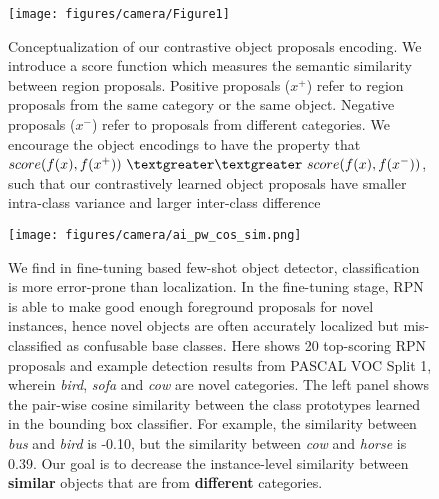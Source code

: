 \documentclass[final]{cvpr}
\begin{document}
\begin{figure}[h]
\begin{center}
\texttt{[image: figures/camera/Figure1]}
\caption{Conceptualization of our contrastive object proposals encoding. We introduce a score function which measures the semantic similarity between region proposals. Positive proposals ($x^+$) refer to region proposals from the same category or the same object. Negative proposals ($x^-$) refer to proposals from different categories. We encourage the object encodings to have the property that $score(f(x),f(x^+))~\textgreater\textgreater~score(f(x),f(x^-))$, such that our contrastively learned object proposals have smaller intra-class variance and larger inter-class difference}
\vspace{-3mm}
\label{fig:figure1} \end{center}
\end{figure}





\begin{figure*}[t]
\texttt{[image: figures/camera/ai\_pw\_cos\_sim.png]}
\centering
\caption{We find in fine-tuning based few-shot object detector, classification is more error-prone than localization. In the fine-tuning stage, RPN is able to make good enough foreground proposals for novel instances, hence novel objects are often accurately localized but mis-classified as confusable base classes. Here shows 20 top-scoring RPN proposals and example detection results from PASCAL VOC Split 1, wherein \textit{bird}, \textit{sofa} and \textit{cow} are novel categories. The left panel shows the pair-wise cosine similarity between the class prototypes learned in the bounding box classifier. For example, the similarity between \textit{bus} and \textit{bird} is -0.10, but the similarity between \textit{cow} and \textit{horse} is 0.39. Our goal is to decrease the instance-level similarity between \textbf{similar} objects that are from \textbf{different} categories.}\label{fig:pw-sim}\end{figure*}



\vspace{-4mm}
\end{document}
